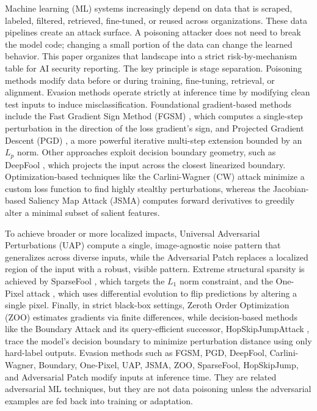 \documentclass[conference]{IEEEtran}
\begin{document}
Machine learning (ML) systems increasingly depend on data that is scraped, labeled, filtered, retrieved, fine-tuned, or reused across organizations. These data pipelines create an attack surface. A poisoning attacker does not need to break the model code; changing a small portion of the data can change the learned behavior. This paper organizes that landscape into a strict risk-by-mechanism table for AI security reporting.
The key principle is stage separation. Poisoning methods modify data before or during training, fine-tuning, retrieval, or alignment.
Evasion methods operate strictly at inference time by modifying clean test inputs to induce misclassification. Foundational gradient-based methods include the Fast Gradient Sign Method (FGSM) \cite{goodfellow2014}, which computes a single-step perturbation in the direction of the loss gradient's sign, and Projected Gradient Descent (PGD) \cite{madry2017}, a more powerful iterative multi-step extension bounded by an $L_p$ norm. Other approaches exploit decision boundary geometry, such as DeepFool \cite{deepfool}, which projects the input across the closest linearized boundary. Optimization-based techniques like the Carlini-Wagner (CW) attack \cite{cw} minimize a custom loss function to find highly stealthy perturbations, whereas the Jacobian-based Saliency Map Attack (JSMA) \cite{jsma} computes forward derivatives to greedily alter a minimal subset of salient features.

To achieve broader or more localized impacts, Universal Adversarial Perturbations (UAP) \cite{uap} compute a single, image-agnostic noise pattern that generalizes across diverse inputs, while the Adversarial Patch \cite{adversarialpatch} replaces a localized region of the input with a robust, visible pattern. Extreme structural sparsity is achieved by SparseFool \cite{sparsefool}, which targets the $L_1$ norm constraint, and the One-Pixel attack \cite{onepixel}, which uses differential evolution to flip predictions by altering a single pixel. Finally, in strict black-box settings, Zeroth Order Optimization (ZOO) \cite{zoo} estimates gradients via finite differences, while decision-based methods like the Boundary Attack \cite{boundaryattack} and its query-efficient successor, HopSkipJumpAttack \cite{hopskipjump}, trace the model's decision boundary to minimize perturbation distance using only hard-label outputs. Evasion methods such as FGSM, PGD, DeepFool, Carlini-Wagner, Boundary, One-Pixel, UAP, JSMA, ZOO, SparseFool, HopSkipJump, and Adversarial Patch modify inputs at inference time. They are related adversarial ML techniques, but they are not data poisoning unless the adversarial examples are fed back into training or adaptation.
\end{document}
